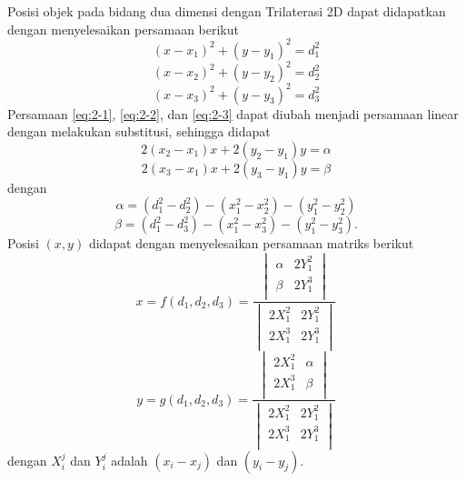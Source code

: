 Posisi objek pada bidang dua dimensi dengan Trilaterasi 2D dapat didapatkan dengan menyelesaikan persamaan berikut
\begin{equation}
\left(x-x_1\right)^2 + \left(y-y_1\right)^2=d_1^2
\label{eq:2-1}
\end{equation}
\begin{equation}
\left(x-x_2\right)^2 + \left(y-y_2\right)^2=d_2^2
\label{eq:2-2}
\end{equation}
\begin{equation}
\left(x-x_3\right)^2 + \left(y-y_3\right)^2=d_3^2
\label{eq:2-3}
\end{equation}
Persamaan \ref{eq:2-1}, \ref{eq:2-2}, dan \ref{eq:2-3} dapat diubah menjadi persamaan linear dengan melakukan substitusi, sehingga didapat
$$2\left(x_2-x_1\right)x +2 \left(y_2-y_1\right)y=\alpha$$
$$2\left(x_3-x_1\right)x+ 2\left(y_3-y_1\right)y=\beta$$
dengan
$$\alpha=\left(d_1^2-d_2^2\right)-\left(x_1^2-x_2^2\right)-\left(y_1^2-y_2^2\right)$$
$$\beta=\left(d_1^2-d_3^2\right)-\left(x_1^2-x_3^2\right)-\left(y_1^2-y_3^2\right).$$
Posisi $\left(x,y\right)$ didapat dengan menyelesaikan persamaan matriks berikut
$$x=f\left(d_1,d_2,d_3\right)=\frac{
	\begin{vmatrix}
			\alpha & 2Y_1^2 \\
			\beta & 2Y_1^3 \\
	\end{vmatrix}}
{
	\begin{vmatrix}
		2X_1^2 & 2Y_1^2 \\
		2X_1^3 & 2Y_1^3 \\
	\end{vmatrix}
}$$
$$y=g\left(d_1,d_2,d_3\right)=\frac{
	\begin{vmatrix}
		2X_1^2 & \alpha \\
		2X_1^3 & \beta \\
\end{vmatrix}}
{
	\begin{vmatrix}
		2X_1^2 & 2Y_1^2 \\
		2X_1^3 & 2Y_1^3 \\
	\end{vmatrix}
}$$
dengan $X_i^j$ dan $Y_i^j$ adalah $\left(x_i-x_j\right)$ dan $\left(y_i-y_j\right)$.


